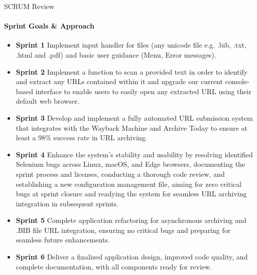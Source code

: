 \documentclass[
ngerman,%
authorontitle=true,
]{bfhbeamer}
\begin{document}
	\begin{frame}{SCRUM Review}
		\framesubtitle{Sprint Goals \& Approach}
		\begin{itemize}
			\item \textbf{Sprint 1} Implement input handler for files (any unicode file e.g. .bib, .txt, .html and .pdf) and basic user guidance (Menu, Error messages).
			\item \textbf{Sprint 2} Implement a function to scan a provided text in order to identify and extract any URLs contained within it and upgrade our current console-based interface to enable users to easily open any extracted URL using their default web browser.
			\item \textbf{Sprint 3} Develop and implement a fully automated URL submission system that integrates with the Wayback Machine and Archive Today to ensure at least a 98\% success rate in URL archiving.
			\item \textbf{Sprint 4} Enhance the system's stability and usability by resolving identified Selenium bugs across Linux, macOS, and Edge browsers, documenting the sprint process and licenses, conducting a thorough code review, and establishing a new configuration management file, aiming for zero critical bugs at sprint closure and readying the system for seamless URL archiving integration in subsequent sprints.
			\item \textbf{Sprint 5} Complete application refactoring for asynchronous archiving and .BIB file URL integration, ensuring no critical bugs and preparing for seamless future enhancements.
			\item \textbf{Sprint 6} Deliver a finalized application design, improved code quality, and complete documentation, with all components ready for review.
		\end{itemize}
	\end{frame}
	
\end{document}
